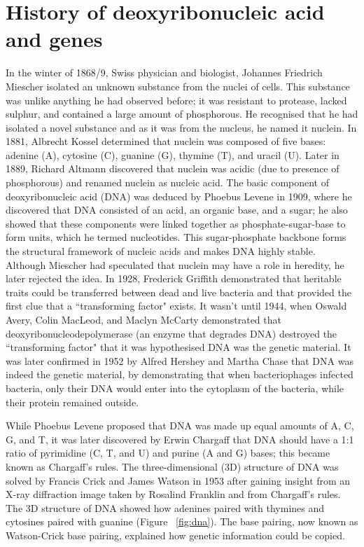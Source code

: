 \section{History of deoxyribonucleic acid and genes}

In the winter of 1868/9, Swiss physician and biologist, Johannes Friedrich Miescher isolated an unknown substance from the nuclei of cells\cite{dahm2008discovering}. This substance was unlike anything he had observed before; it was resistant to protease, lacked sulphur, and contained a large amount of phosphorous. He recognised that he had isolated a novel substance and as it was from the nucleus, he named it nuclein. In 1881, Albrecht Kossel determined that nuclein was composed of five bases: adenine (A), cytosine (C), guanine (G), thymine (T), and uracil (U). Later in 1889, Richard Altmann discovered that nuclein was acidic (due to presence of phosphorous) and renamed nuclein  as nucleic acid. The basic component of deoxyribonucleic acid (DNA) was deduced by Phoebus Levene in 1909, where he discovered that DNA consisted of an acid, an organic base, and a sugar; he also showed that these components were linked together as phosphate-sugar-base to form units, which he termed nucleotides. This sugar-phosphate backbone forms the structural framework of nucleic acids and makes DNA highly stable. Although Miescher had speculated that nuclein may have a role in heredity, he later rejected the idea. In 1928, Frederick Griffith demonstrated that heritable traits could be transferred between dead and live bacteria and that provided the first clue that a ``transforming factor" exists\cite{griffith1928significance}. It wasn't until 1944, when Oswald Avery, Colin MacLeod, and Maclyn McCarty demonstrated that deoxyribonucleodepolymerase (an enzyme that degrades DNA) destroyed the ``transforming factor" that it was hypothesised DNA was the genetic material\cite{avery1944studies}. It was later confirmed in 1952 by Alfred Hershey and Martha Chase that DNA was indeed the genetic material, by demonstrating that when bacteriophages infected bacteria, only their DNA would enter into the cytoplasm of the bacteria, while their protein remained outside\cite{hershey1952independent}.

While Phoebus Levene proposed that DNA was made up equal amounts of A, C, G, and T, it was later discovered by Erwin Chargaff that DNA should have a 1:1 ratio of pyrimidine (C, T, and U) and purine (A and G) bases\cite{pmid14938364, pmid14945441}; this became known as Chargaff's rules. The three-dimensional (3D) structure of DNA was solved by Francis Crick and James Watson in 1953\cite{WATSON_1953} after gaining insight from an X-ray diffraction image taken by Rosalind Franklin and from Chargaff's rules. The 3D structure of DNA showed how adenines paired with thymines and cytosines paired with guanine (Figure ~\ref{fig:dna}). The base pairing, now known as Watson-Crick base pairing, explained how genetic information could be copied.

